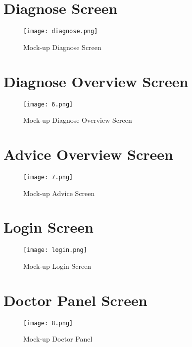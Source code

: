 \tocless\section{Diagnose Screen}
\begin{figure}[H]
	\centering
	\texttt{[image: diagnose.png]}
	\caption{Mock-up Diagnose Screen}
\end{figure}

\tocless\section{Diagnose Overview Screen}
\begin{figure}[H]
	\centering
	\texttt{[image: 6.png]}
	\caption{Mock-up Diagnose Overview Screen}
\end{figure}

\tocless\section{Advice Overview Screen}
\begin{figure}[H]
	\centering
	\texttt{[image: 7.png]}
	\caption{Mock-up Advice Screen}
\end{figure}

\tocless\section{Login Screen}
\begin{figure}[H]
	\centering
	\texttt{[image: login.png]}
	\caption{Mock-up Login Screen}
\end{figure}

\tocless\section{Doctor Panel Screen}
\begin{figure}[H]
	\centering
	\texttt{[image: 8.png]}
	\caption{Mock-up Doctor Panel}
\end{figure}



